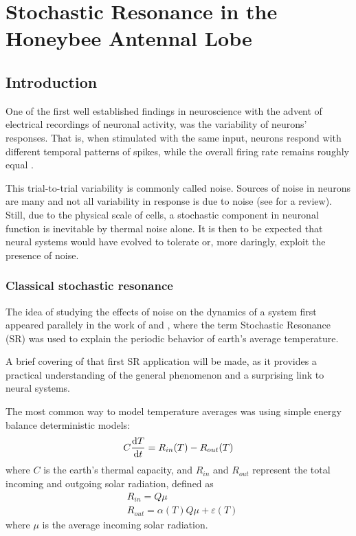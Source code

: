 \chapter{Stochastic Resonance in the Honeybee Antennal Lobe}
\section{Introduction}

One of the first well established findings in neuroscience with the advent of electrical recordings of neuronal activity, was the variability of neurons' responses. 
That is, when stimulated with the same input, neurons respond with different temporal patterns of spikes, while the overall firing rate remains roughly equal \cite{tomkoNeuronalVariabilityNonstationary1974,mainenReliabilitySpikeTiming1995,tolhurstStatisticalReliabilitySignals1983}.

This trial-to-trial variability is commonly called noise. 
Sources of noise in neurons are many and not all variability in response is due to noise (see \parencite{faisalNoiseNervousSystem2008} for a review). 
Still, due to the physical scale of cells, a stochastic component in neuronal function is inevitable by thermal noise alone. %
It is then to be expected that neural systems would have evolved to tolerate or, more daringly, exploit the presence of noise. 

\subsection{Classical stochastic resonance}
\label{sec:classic-SR}
The idea of studying the effects of noise on the dynamics of a system first appeared parallely in the work of \textcite{benziMechanismStochasticResonance1981} and \textcite{nicolisStochasticAspectsClimatic1982}, where the term Stochastic Resonance (SR) was used to explain the periodic behavior of earth's average temperature. 

A brief covering of that first SR application will be made, as it provides a practical understanding of the general phenomenon and a surprising link to neural systems.

The most common way to model temperature averages was using simple energy balance deterministic models:
\begin{equation}
    \label{eq:temp model}
    C\odv{T}{t} = R_{in}(T) - R_{out}(T)
\end{equation}
where $C$ is the earth's thermal capacity, and $R_{in}$ and $R_{out}$ represent the total incoming and outgoing solar radiation, defined as
\begin{align*}
    &R_{in} = Q\mu \\
    &R_{out} = \alpha(T)Q\mu + \varepsilon(T)
\end{align*}
where $\mu$ is the average incoming solar radiation.

